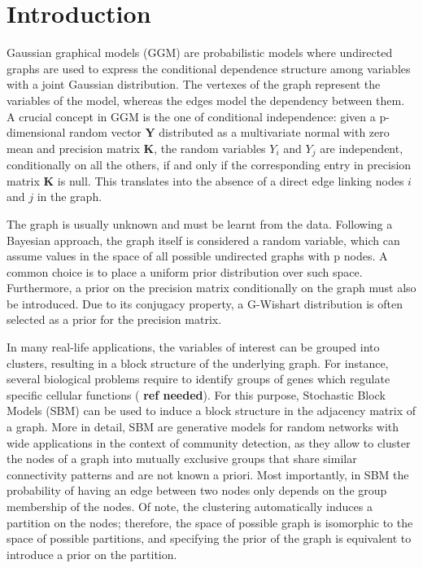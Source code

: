 
\section{Introduction}

Gaussian graphical models (GGM) are probabilistic models where undirected graphs are used to express the conditional dependence structure among variables with a joint Gaussian distribution. The vertexes of the graph represent the variables of the model, whereas the edges model the dependency between them. A crucial concept in GGM is the one of conditional independence: given a p-dimensional random vector $\mathbf{Y}$ distributed as a multivariate normal with zero mean and precision matrix $\mathbf{K}$, the random variables $Y_i$ and $Y_j$ are independent, conditionally on all the others, if and only if the corresponding entry in precision matrix $\mathbf{K}$ is null. This translates into the absence of a direct edge linking nodes $i$ and $j$ in the graph. 

The graph is usually unknown and must be learnt from the data. Following a Bayesian approach, the graph itself is considered a random variable, which can assume values in the space of all possible undirected graphs with p nodes. A common choice is to place a uniform prior distribution over such space. Furthermore, a prior on the precision matrix conditionally on the graph must also be introduced. Due to its conjugacy property, a G-Wishart distribution is often selected as a prior for the precision matrix.

In many real-life applications, the variables of interest can be grouped into clusters, resulting in a block structure of the underlying graph. For instance, several biological problems require to identify groups of genes which regulate specific cellular functions (\textbf{ ref needed}). For this purpose, Stochastic Block Models (SBM) can be used to induce a block structure in the adjacency matrix of a graph. More in detail, SBM are generative models for random networks with wide applications in the context of community detection, as they allow to cluster the nodes of a graph into mutually exclusive groups that share similar connectivity patterns and are not known a priori. Most importantly, in SBM the probability of having an edge between two nodes only depends on the group membership of the nodes. Of note, the clustering automatically induces a partition on the nodes; therefore, the space of possible graph is isomorphic to the space of possible partitions, and specifying the prior of the graph is equivalent to introduce a prior on the partition.

